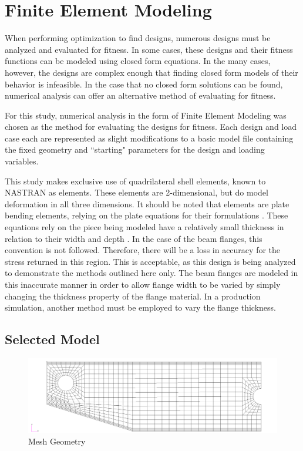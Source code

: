 \section{Finite Element Modeling}

When performing optimization to find designs, numerous designs must be analyzed and evaluated for fitness. In some cases, these designs and their fitness functions can be modeled using closed form equations. In the many cases, however, the designs are complex enough that finding closed form models of their behavior is infeasible. In the case that no closed form solutions can be found, numerical analysis can offer an alternative method of evaluating for fitness. 

For this study, numerical analysis in the form of Finite Element Modeling was chosen as the method for evaluating the designs for fitness. Each design and load case each are represented as slight modifications to a basic model file containing the fixed geometry and ``starting" parameters for the design and loading variables.  

This study makes exclusive use of quadrilateral shell elements, known to NASTRAN as  elements. These elements are 2-dimensional, but do model deformation in all three dimensions. It should be noted that  elements are plate bending elements, relying on the plate equations for their formulations \cite{nastran-qrg}. These equations rely on the piece being modeled have a relatively small thickness in relation to their width and depth \cite{reddy}. In the case of the beam flanges, this convention is not followed. Therefore, there will be a loss in accuracy for the stress returned in this region. This is acceptable, as this design is being analyzed to demonstrate the methods outlined here only. The beam flanges are modeled in this inaccurate manner in order to allow flange width to be varied by simply changing the thickness property of the flange material. In a production simulation, another method must be employed to vary the flange thickness.  

\subsection{Selected Model}
\label{sec:model}

\begin{figure}
\includegraphics[width=\textwidth]{img/mesh_geom.png}
\caption{Mesh Geometry}
\label{img:mesh_geom}
\end{figure}

